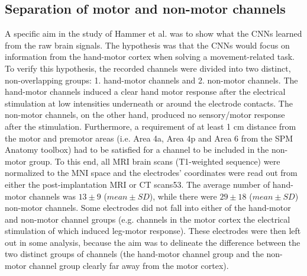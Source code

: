\subsection{Separation of motor and non-motor channels}\label{subsec:separation-of-motor-and-non-motor-channels}
A specific aim in the study of Hammer et al.\cite{Hammer-2021} was to show what the CNNs learned from the raw brain signals.
The hypothesis was that the CNNs would focus on information from the hand-motor cortex when solving a movement-related task.
To verify this hypothesis, the recorded channels were divided into two distinct, non-overlapping groups: 1. hand-motor channels and 2. non-motor channels.
The hand-motor channels induced a clear hand motor response after the electrical stimulation at low intensities underneath or around the electrode contacts.
The non-motor channels, on the other hand, produced no sensory/motor response after the stimulation.
Furthermore, a requirement of at least 1 cm distance from the motor and premotor areas (i.e. Area 4a, Area 4p and Area 6 from the SPM Anatomy toolbox\cite{eickhoff-new-2005}) had to be satisfied for a channel to be included in the non-motor group.
To this end, all MRI brain scans (T1-weighted sequence) were normalized to the MNI space and the electrodes' coordinates were read out from either the post-implantation MRI or CT scans53.
The average number of hand-motor channels was $13 \pm 9$ ($mean \pm SD$), while there were $29 \pm 18$ ($mean \pm SD$) non-motor channels.
Some electrodes did not fall into either of the hand-motor and non-motor channel groups (e.g. channels in the motor cortex the electrical stimulation of which induced leg-motor response).
These electrodes were then left out in some analysis, because the aim was to delineate the difference between the two distinct groups of channels (the hand-motor channel group and the non-motor channel group clearly far away from the motor cortex).


